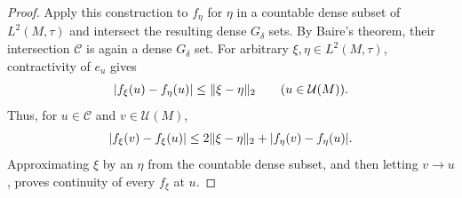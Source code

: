 \begin{proof}
Apply this construction to $f_\eta$ for $\eta$ in a countable dense
subset of $L^2(M,\tau)$ and intersect the resulting dense
$G_\delta$ sets. By Baire's theorem, their intersection
$\mathcal C$ is again a dense $G_\delta$ set.
For arbitrary $\xi,\eta\in L^2(M,\tau)$, contractivity of $e_u$ gives
\begin{equation}
 \label{eq:projection-vector-lipschitz}
 |f_\xi(u)-f_\eta(u)|\leq\lVert \xi-\eta\rVert_2
 \qquad(u\in\mathcal U(M)).
\end{equation}
Thus, for $u\in\mathcal C$ and $v\in\mathcal U(M)$,
\[
 |f_\xi(v)-f_\xi(u)|
 \leq2\lVert \xi-\eta\rVert_2+|f_\eta(v)-f_\eta(u)|.
\]
Approximating $\xi$ by an $\eta$ from the countable dense subset,
and then letting $v\to u$, proves continuity of every $f_\xi$ at $u$.
\end{proof}

